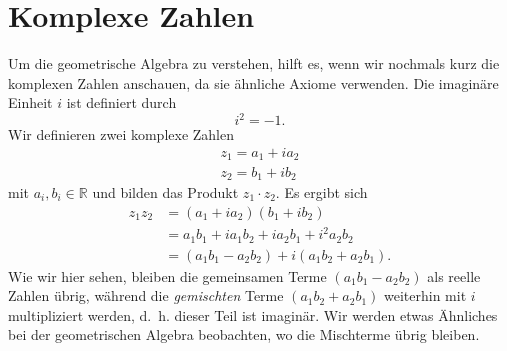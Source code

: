 %
%
%
%
\section{Komplexe Zahlen
\label{geoalgebra:section:komplexe-zahlen}}
Um die geometrische Algebra zu verstehen, hilft es, wenn wir nochmals kurz die komplexen Zahlen anschauen, da sie ähnliche Axiome verwenden.
%
Die imaginäre Einheit $i$ ist definiert durch
\begin{equation*}
  i^2 = -1.
\end{equation*}
Wir definieren zwei komplexe Zahlen
\begin{align*}
  z_1 = a_1 + i a_2 \\
  z_2 = b_1 + i b_2 
\end{align*}
mit $a_i, b_i \in \mathbb{R}$
und bilden das Produkt $z_1 \cdot{} z_2$. Es ergibt sich
\begin{align*}
  z_1 z_2 &= (a_1 + i a_2) (b_1 + i b_2) \\
  &= a_1 b_1 + i a_1 b_2 + i a_2 b_1 + i^2 a_2 b_2 \\
  &= (a_1 b_1 - a_2 b_2) + i (a_1 b_2 + a_2 b_1).
\end{align*}
Wie wir hier sehen, bleiben die gemeinsamen Terme $(a_1 b_1 - a_2 b_2)$ als reelle Zahlen übrig, während die \emph{gemischten} Terme $(a_1 b_2 + a_2 b_1)$ weiterhin mit $i$
multipliziert werden, d.~h. dieser Teil ist imaginär. Wir werden etwas Ähnliches bei der geometrischen Algebra beobachten, wo die Mischterme übrig bleiben.




